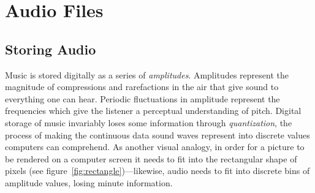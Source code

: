 \section{Audio Files}

\subsection{Storing Audio}

Music is stored digitally as a series of \textit{amplitudes}. Amplitudes represent the magnitude of compressions and rarefactions in the air that give sound to everything one can hear. Periodic fluctuations in amplitude represent the frequencies which give the listener a perceptual understanding of pitch. Digital storage of music invariably loses some information through \textit{quantization}, the process of making the continuous data sound waves represent into discrete values computers can comprehend. As another visual analogy, in order for a picture to be rendered on a computer screen it needs to fit into the rectangular shape of pixels (see figure~\ref{fig:rectangle})---likewise, audio needs to fit into discrete bins of amplitude values, losing minute information.